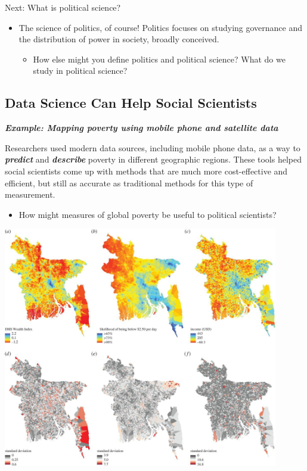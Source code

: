 \documentclass[
  letterpaper,
  DIV=11,
  numbers=noendperiod]{scrreprt}
\providecommand{\tightlist}{%
  \setlength{\itemsep}{0pt}\setlength{\parskip}{0pt}}\usepackage{longtable,booktabs,array}
\begin{document}
Next: What is political science?

\begin{itemize}
\tightlist
\item
  The science of politics, of course! Politics focuses on studying
  governance and the distribution of power in society, broadly
  conceived.

  \begin{itemize}
  \tightlist
  \item
    How else might you define politics and political science? What do we
    study in political science?
  \end{itemize}
\end{itemize}

\hypertarget{data-science-can-help-social-scientists}{%
\subsection{Data Science Can Help Social
Scientists}\label{data-science-can-help-social-scientists}}

\textbf{\emph{Example: Mapping poverty using mobile phone and satellite
data}}

Researchers used modern data sources, including mobile phone data, as a
way to \textbf{\emph{predict}} and \textbf{\emph{describe}} poverty in
different geographic regions. These tools helped social scientists come
up with methods that are much more cost-effective and efficient, but
still as accurate as traditional methods for this type of measurement.

\begin{itemize}
\tightlist
\item
  How might measures of global poverty be useful to political
  scientists?
\end{itemize}

\includegraphics[width=0.9\textwidth,height=\textheight]{images/blum.jpg}
\end{document}
